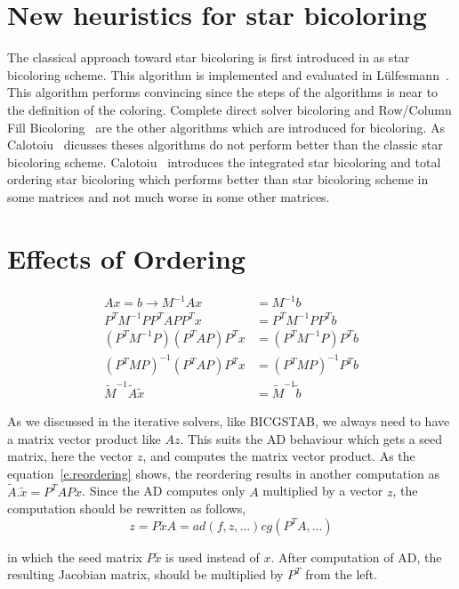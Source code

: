 \documentclass[12pt, oneside]{book}
\begin{document}
\section{New heuristics for star bicoloring}
\label{s.heuristic.starbicoloring}
The classical approach toward star bicoloring is first introduced in 
\cite{Gebremedhin05whatcolor} as star bicoloring scheme.
This algorithm is implemented and evaluated in
Lülfesmann~\cite{LulfesmannMaster}. This algorithm performs convincing
since the steps of the algorithms is near to the definition of the coloring.
Complete direct solver bicoloring and Row/Column Fill Bicoloring~\cite{Hossain95computinga}
are the other algorithms which are introduced for bicoloring.
As Calotoiu~\cite{CalotoiuMaster} dicusses theses algorithms do not perform
better than the classic star bicoloring scheme.
Calotoiu~\cite{CalotoiuMaster} introduces the integrated star bicoloring 
and total ordering star bicoloring which performs better than 
star bicoloring scheme in some matrices and not much worse in some other
matrices.

\section{Effects of Ordering}
\label{s.ordering.effect}
\begin{align*} 
Ax = b \rightarrow M^{-1} Ax &= M^{-1}b\\
P^T M^{-1} P P^T A P P^T x &= P^T M^{-1} P P^T b\\
(P^T M^{-1} P) (P^T A P) P^T x &= (P^T M^{-1} P) P^T b\\
(P^T M P)^{-1} (P^T A P) P^T x &= (P^T M P)^{-1} P^T b\\
\tilde{M}^{-1}\tilde{A}\tilde{x} &= \tilde{M}^{-1}\tilde{b} 
\label{e.reordering}
\end{align*}

As we discussed in the iterative solvers, like BICGSTAB,
we always need to have a matrix vector product like $Az$.
This suits the AD behaviour which gets a seed matrix, here the vector $z$, and
computes the matrix vector product. As the equation~\ref{e.reordering} shows,
the reordering results in another computation as $\tilde{A}.\tilde{x} = P^T A P x$.
Since the AD computes only $A$ multiplied by a vector $z$, 
the computation should be rewritten as follows,
$$
z = P \tilde{x}
A = ad(f,z,...)
cg(P^T A,...)
$$

in which the seed matrix $P \tilde{x}$ is used instead of $x$.
After computation of AD, the resulting Jacobian matrix, should be multiplied
by $P^T$ from the left.
\end{document}
